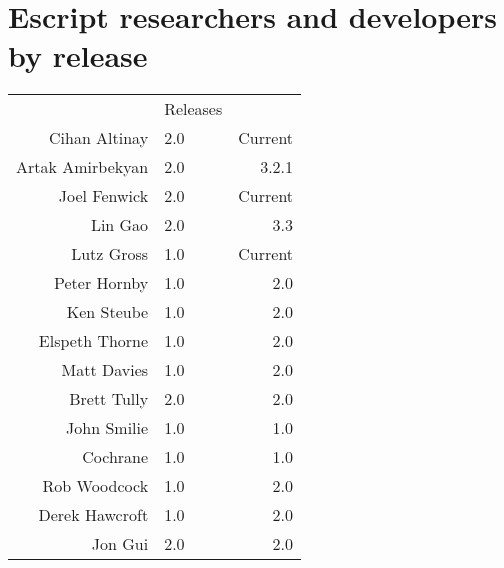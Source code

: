 
\chapter{Escript researchers and developers by release}

\begin{center}
\begin{tabular}{r|lr|}
& Releases\\ \cline{2-3}
Cihan Altinay & 2.0 & Current \\
Artak Amirbekyan & 2.0 & 3.2.1 \\
Joel Fenwick & 2.0 & Current \\
Lin Gao & 2.0 & 3.3 \\
Lutz Gross & 1.0 & Current \\
Peter Hornby & 1.0 & 2.0 \\
Ken Steube & 1.0 & 2.0 \\
Elspeth Thorne & 1.0 & 2.0 \\
Matt Davies & 1.0 & 2.0 \\
Brett Tully & 2.0 & 2.0 \\
John Smilie & 1.0 & 1.0 \\
Cochrane & 1.0 & 1.0 \\
Rob Woodcock & 1.0 & 2.0 \\
Derek Hawcroft & 1.0 & 2.0 \\
Jon Gui & 2.0 & 2.0 \\
\cline{2-3}
\end{tabular}
\end{center}
